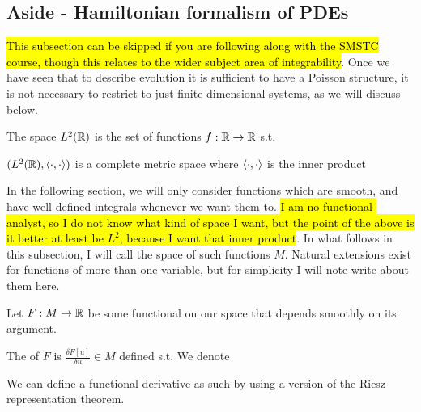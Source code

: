 \documentclass{article}
\begin{document}
\subsection{Aside - Hamiltonian formalism of PDEs}
\hl{This subsection can be skipped if you are following along with the SMSTC course, though this relates to the wider subject area of integrability}.
\newline
Once we have seen that to describe evolution it is sufficient to have a Poisson structure, it is not necessary to restrict to just finite-dimensional systems, as we will discuss below. 

\begin{definition}[$L^2$ space]
	The space $L^2(\mathbb{R})$ is the set of functions $f:\mathbb{R} \to \mathbb{R}$ s.t.
\end{definition}

\begin{fact}
	$(L^2(\mathbb{R}),\left\langle \cdot,\cdot \right\rangle)$ is a complete metric space where $\left\langle \cdot,\cdot \right\rangle$ is the inner product
\end{fact}

\begin{remark}
	In the following section, we will only consider functions which are smooth, and have well defined integrals whenever we want them to. \hl{I am no functional-analyst, so I do not know what kind of space I want, but the point of the above is it better at least be $L^2$, because I want that inner product}. In what follows in this subsection, I will call the space of such functions $M$. Natural extensions exist for functions of more than one variable, but for simplicity I will note write about them here. 
\end{remark}

Let $F:M \to \mathbb{R}$ be some functional on our space that depends smoothly on its argument.  

\begin{definition}
	The  of $F$ is $\frac{\delta F[u]}{\delta u} \in M$ defined s.t. 
We denote 
\end{definition}

\begin{remark}
	We can define a functional derivative as such by using a version of the Riesz representation theorem. 
\end{remark}
\end{document}
